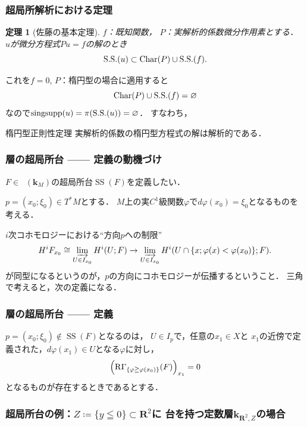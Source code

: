 \documentclass[dvipdfmx,10pt,aspectratio=169,leqno]{beamer}%
\newcommand{\rr}{\mathbf{R}}
\newcommand{\kk}{\mathbf{k}}
\numberwithin{equation}{subsection}
\newcommand{\Dompb}{\mathop{\mathsf{D}^\mathrm{b}}\nolimits}
\newcommand{\muS}{\mathop{\mathrm{SS}}\nolimits}
\newcommand{\RG}{\mathop{\mathrm{R}\hspace{-0pt}\Gamma}\nolimits}
\newcommand{\indlim}[1][]{\mathop{\varinjlim}\limits_{#1}}
\newcommand{\cotb}[1][]{T^{\ast}{#1}}
\theoremstyle{mystyle}
\newtheorem{THM}[AXM]{定理}
\begin{document}
\begin{frame}\frametitle{超局所解析における定理} 
    \begin{THM}[佐藤の基本定理{\cite{Sato69,Sato70}}]
        \(f\)：既知関数，
        \(P\)：実解析的係数微分作用素とする．
        \(u\)が微分方程式\(Pu=f\)の解のとき
        \[
            \mathop{\mathrm{S.S.}}\nolimits(u)\subset \mathop{\mathrm{Char}}\nolimits(P)\cup\mathop{\mathrm{S.S.}}\nolimits(f).
        \]
    \end{THM}
    これを\(f=0\), \(P\)：楕円型の場合に適用すると
    \[
        \mathop{\mathrm{Char}}\nolimits(P)\cup \mathop{\mathrm{S.S.}}\nolimits(f)=\varnothing
    \]
    なので\(\mathop{\mathrm{singsupp}}\nolimits(u)=\pi(\mathop{\mathrm{S.S.}}\nolimits(u))=\varnothing\)．
    すなわち，
    \begin{alertblock}{楕円型正則性定理}
        実解析的係数の楕円型方程式の解は解析的である．
    \end{alertblock}
\end{frame}


\begin{frame}\frametitle{層の超局所台 ------ 定義の動機づけ}
    \(F\in\Dompb(\kk_M)\)の超局所台\(\muS(F)\)を定義したい．

    \(p=(x_0;\xi_0)\in\cotb[M]\)とする．
    \(M\)上の実\(C^1\)級関数\(\varphi\)で\(
        d\varphi(x_0)=\xi_0
    \)となるものを考える．

    \(i\)次コホモロジーにおける``方向\(p\)への制限''
    \[
        H^iF_{x_0}\cong \indlim[U\in I_{x_0}]H^i(U;F)
        \to
        \indlim[U\in I_{x_0}]H^i(U\cap\{x;\varphi(x)<\varphi(x_0)\};F).
    \]
    が同型になるというのが，\(p\)の方向にコホモロジーが伝播するということ．
    三角で考えると，次の定義になる．
\end{frame}


\begin{frame}\frametitle{層の超局所台 ------ 定義}
    
    \begin{Definition}[層の超局所台]
        \(p=(x_0;\xi_0)\notin \muS(F)\)となるのは，
        \(U\in I_{p}\)で，任意の\(x_1\in X\)と
        \(x_1\)の近傍で定義された，\(
            d\varphi(x_1)\in U
        \)となる\(\varphi\)に対し，\[
            \left(\RG_{\{\varphi\geqq\varphi(x_0)\}}(F)\right)_{x_1}=0
        \]
        となるものが存在するときであるとする．
    \end{Definition}
\end{frame}

\begin{frame}
    \frametitle{
        超局所台の例：\(Z\coloneqq\{y\leqq0\}\subset\rr^2\)に
        台を持つ定数層\(\kk_{\rr^2,Z}\)の場合}
\end{frame}
\end{document}
